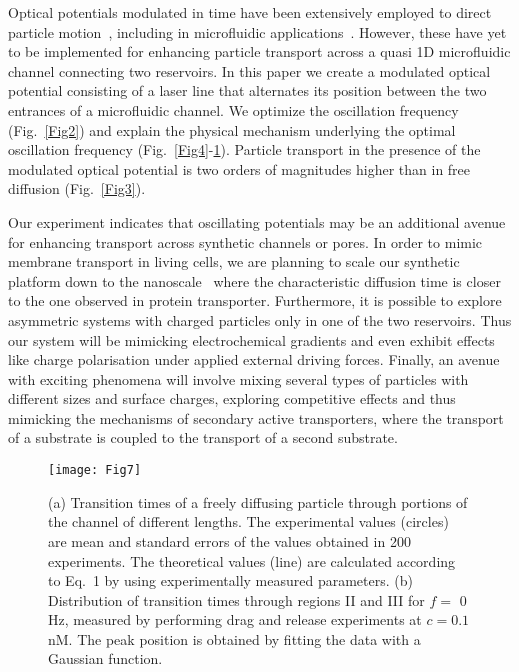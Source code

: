 \documentclass[
 reprint,
 aps, showkeys, showpacs
]{revtex4-1}
\begin{document}
Optical potentials modulated in time have been extensively employed to direct particle motion~\cite{Lee2006,Juniper2016,Faucheux1995,Leea,Bleil2007,Gorre-Talini1997,MacDonald2003,Jonas2008,Xiao,Ladavac,Simon1992,Babic2004a,Schmitt2006}, including in microfluidic applications~\cite{MacDonald2003}. However, these have yet to be implemented for enhancing particle transport across a quasi 1D microfluidic channel connecting two reservoirs. In this paper we create a modulated optical potential consisting of a laser line that alternates its position between the two entrances of a microfluidic channel. We optimize the oscillation frequency (Fig.~\ref{Fig2}) and explain the physical mechanism underlying the optimal oscillation frequency (Fig.~\ref{Fig4}-\ref{Fig7}). Particle transport in the presence of the modulated optical potential is two orders of magnitudes higher than in free diffusion (Fig.~\ref{Fig3}).

Our experiment indicates that oscillating potentials may be an additional avenue for enhancing transport across synthetic channels or pores. In order to mimic membrane transport in living cells, we are planning to scale our synthetic platform down to the nanoscale~\cite{bell2011dna} where the characteristic diffusion time is closer to the one observed in protein transporter. Furthermore, it is possible to explore asymmetric systems with charged particles only in one of the two reservoirs. Thus our system will be mimicking electrochemical gradients and even exhibit effects like charge polarisation under applied external driving forces. Finally, an avenue with exciting phenomena will involve mixing several types of particles with different sizes and surface charges, exploring competitive effects and thus mimicking the mechanisms of secondary active transporters, where the transport of a substrate is coupled to the transport of a second substrate.

\begin{figure}
	\texttt{[image: Fig7]}
	\caption{\label{Fig7} (a) Transition times of a freely diffusing particle through portions of the channel of different lengths. The experimental values (circles) are mean and standard errors of the values obtained in 200 experiments. The theoretical values (line) are calculated according to Eq.~1 by using experimentally measured parameters. (b) Distribution of transition times through regions II and III for $f =$ 0 Hz, measured by performing drag and release experiments at $c=0.1$ nM. The peak position is obtained by fitting the data with a Gaussian function.}
\end{figure}
\end{document}

